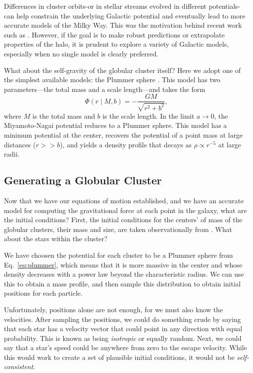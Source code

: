         Differences in cluster orbits-or in stellar streams evolved in different potentials-can help constrain the underlying Galactic potential and eventually lead to more accurate models of the Milky Way. This was the motivation behind recent work such as \citet{2024ApJ...967...89I}. However, if the goal is to make robust predictions or extrapolate properties of the halo, it is prudent to explore a variety of Galactic models, especially when no single model is clearly preferred.

        What about the self-gravity of the globular cluster itself? Here we adopt one of the simplest available models: the Plummer sphere \citep{1911MNRAS..71..460P}. This model has two parameters—the total mass and a scale length—and takes the form
        \begin{equation} \label{eq:plummer}
            \Phi(r \mid M, b) = -\frac{G M}{\sqrt{r^2 + b^2}},
        \end{equation}
        where $M$ is the total mass and $b$ is the scale length. In the limit $a \rightarrow 0$, the Miyamoto-Nagai potential reduces to a Plummer sphere. This model has a minimum potential at the center, recovers the potential of a point mass at large distances ($r >> b$), and yields a density profile that decays as $\rho \propto r^{-5}$ at large radii.

    
    \subsection{Generating a Globular Cluster}\label{subsec:initialconditions}

        Now that we have our equations of motion established, and we have an accurate model for computing the gravitational force at each point in the galaxy, what are the initial conditions? First, the initial conditions for the centers' of mass of the globular clusters, their mass and size, are taken observationally from \citet{2018MNRAS.478.1520B}. What about the stars within the cluster? 

        We have choosen the potential for each cluster to be a Plummer sphere from Eq.~\ref{eq:plummer}, which means that it is more massive in the center and whose density decreases with a power law beyond the characteristic radius. We can use this to obtain a mass profile, and then sample this distribution to obtain initial positions for each particle. 

        Unfortunately, positions alone are not enough, for we must also know the velocities. After sampling the positions, we could do something crude by saying that each star has a velocity vector that could point in any direction with equal probability. This is known as being \textit{isotropic} or equally random. Next, we could say that a star's speed could be anywhere from zero to the escape velocity. While this would work to create a set of plausible initial conditions, it would not be \textit{self-consistent}. 

